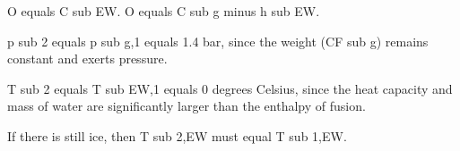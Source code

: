 O equals C sub EW. O equals C sub g minus h sub EW.  

p sub 2 equals p sub g,1 equals 1.4 bar, since the weight (CF sub g) remains constant and exerts pressure.  

T sub 2 equals T sub EW,1 equals 0 degrees Celsius, since the heat capacity and mass of water are significantly larger than the enthalpy of fusion.  

If there is still ice, then T sub 2,EW must equal T sub 1,EW.